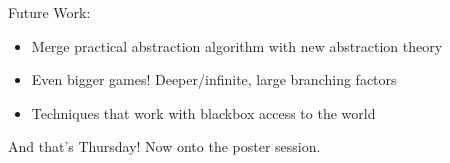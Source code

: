 Future Work:
\begin{itemize}
    \item Merge practical abstraction algorithm with new abstraction theory
    \item Even bigger games! Deeper/infinite, large branching factors
    \item Techniques that work with blackbox access to the world
\end{itemize}

And that's Thursday! Now onto the poster session.

\spacerule
